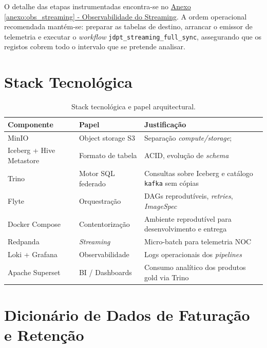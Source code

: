 \documentclass[runningheads]{llncs}
\begin{document}
O detalhe das etapas instrumentadas encontra-se no \hyperref[anexo:obs_streaming]{Anexo \ref*{anexo:obs_streaming} - Observabilidade do Streaming}. A ordem operacional recomendada mantém-se: preparar as tabelas de destino, arrancar o emissor de telemetria e executar o \textit{workflow} \texttt{jdpt\_streaming\_full\_sync}, assegurando que os registos cobrem todo o intervalo que se pretende analisar.


\clearpage
\appendix

\section{Stack Tecnológica}
\label{anexo:stack}

\begin{table}[ht]
\centering
\caption{Stack tecnológica e papel arquitectural.}
\label{tab:stack}
\renewcommand{\arraystretch}{1.15}
\small
\begin{tabularx}{\textwidth}{@{}l l X@{}}
\toprule
\textbf{Componente} & \textbf{Papel} & \textbf{Justificação} \\
\midrule
MinIO & Object storage S3 & Separação \textit{compute/storage}; \\
Iceberg + Hive Metastore & Formato de tabela & ACID, evolução de \textit{schema} \\
Trino & Motor SQL federado & Consultas sobre Iceberg e catálogo \texttt{kafka} sem cópias \\
Flyte & Orquestração & DAGs reprodutíveis, \textit{retries}, \textit{ImageSpec} \\
Docker Compose & Contentorização & Ambiente reprodutível para desenvolvimento e entrega \\
Redpanda & \textit{Streaming} & Micro-batch para telemetria NOC\\
Loki + Grafana & Observabilidade & Logs operacionais dos \textit{pipelines} \\
Apache Superset & BI / Dashboards & Consumo analítico dos produtos gold via Trino \\
\bottomrule
\end{tabularx}
\end{table}

\clearpage

\section{Dicionário de Dados de Faturação e Retenção}
\label{anexo:dic_faturacao}
\end{document}
